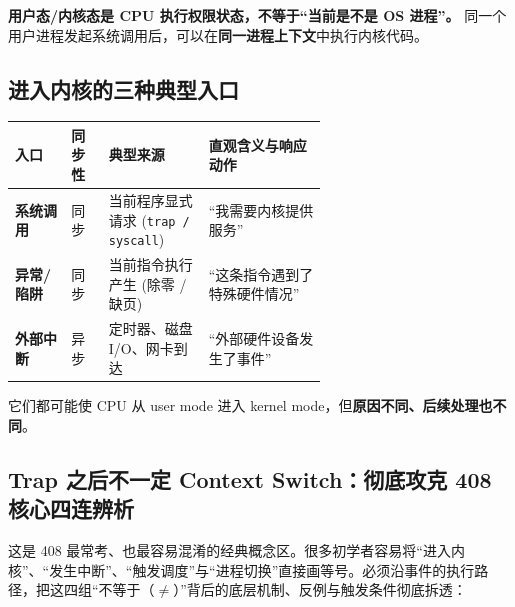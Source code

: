 \documentclass[11pt,a4paper]{ctexart}
\newcommand{\kw}[1]{\textbf{#1}}
\newcommand{\code}[1]{\texttt{#1}}
\begin{document}
\begin{corebox}[关键理解]
\kw{用户态/内核态是 CPU 执行权限状态，不等于“当前是不是 OS 进程”。} 同一个用户进程发起系统调用后，可以在\kw{同一进程上下文}中执行内核代码。
\end{corebox}

\subsection{进入内核的三种典型入口}

\begingroup
\small
\renewcommand{\arraystretch}{1.25}
\setlength{\tabcolsep}{5pt}
\begin{tabularx}{\linewidth}{>{\bfseries}p{0.18\linewidth} p{0.12\linewidth} p{0.32\linewidth} X}
\toprule
入口 & 同步性 & 典型来源 & 直观含义与响应动作\\
\midrule
系统调用 & 同步 & 当前程序显式请求 (\code{trap / syscall}) & “我需要内核提供服务”\\
异常/陷阱 & 同步 & 当前指令执行产生 (除零 / 缺页) & “这条指令遇到了特殊硬件情况”\\
外部中断 & 异步 & 定时器、磁盘 I/O、网卡到达 & “外部硬件设备发生了事件”\\
\bottomrule
\end{tabularx}
\endgroup

它们都可能使 CPU 从 user mode 进入 kernel mode，但\kw{原因不同、后续处理也不同}。

\subsection{Trap 之后不一定 Context Switch：彻底攻克 408 核心四连辨析}

这是 408 最常考、也最容易混淆的经典概念区。很多初学者容易将“进入内核”、“发生中断”、“触发调度”与“进程切换”直接画等号。必须沿事件的执行路径，把这四组“不等于（$\neq$）”背后的底层机制、反例与触发条件彻底拆透：

\begin{center}
\begingroup
\small
{}
\endgroup
\end{center}
\end{document}

